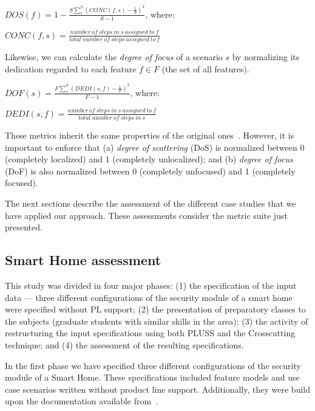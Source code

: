 \documentclass{acm_proc_article-sp}
\begin{document}
\begin{center}
$DOS(f) = 1 - \frac{S \sum_{s}^{S}(CONC(f,s)-\frac{1}{S})^2}{S-1}$, where:

$CONC(f,s) = \frac{number\ of\ steps\ in\ s\ assigned\ to\ f}{total\ number\
of\ steps\ assigned\ to\ f}$
\end{center}

Likewise, we can calculate the \emph{degree of focus} of a scenario $s$ by
normalizing its dedication regarded to each feature $f \in F$ (the set of
all features).

\begin{center}
$DOF(s) = \frac{F \sum_{f}^{F}(DEDI(s,f)-\frac{1}{F})^2}{F-1}$, where:

$DEDI(s,f) = \frac{number\ of\ steps\ in\ s\ assigned\ to\ f}{total\ number\
of\ steps\ in\ s}$
\end{center}

These metrics inherit the same properties of the original
ones~\cite{Eaddy:2007aa}. However, it is important to enforce that (a)
\emph{degree of scattering} (DoS) is normalized between 0 (completely localized)
and 1 (completely unlocalized); and (b) \emph{degree of focus} (DoF) is also
normalized between 0 (completely unfocused) and 1 (completely focused).

The next sections describe the assessment of the different case studies that we
have applied our approach. These assessments consider the metric suite just
presented.

\subsection{Smart Home assessment}

This study was divided in four major phases: (1) the specification of the input
data --- three different configurations of the security module of a smart home
were specified without PL support; (2) the presentation of preparatory classes to the subjects
(graduate students with similar skills in the area); (3) the activity of
restructuring the input specifications using both PLUSS and the Crosscutting
technique; and (4) the assessment of the resulting specifications.

In the first phase we have specified three different configurations of the
security module of a Smart Home. These specifications included feature models and
use case scenarios written without product line support. Additionally, they were
build upon the documentation available from~\cite{Pohl:2005aa,AMPLE}.
\end{document}
